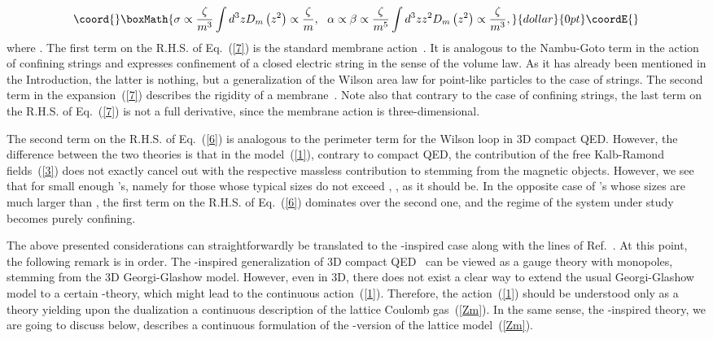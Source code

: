 \documentclass[a4paper,12pt]{article}
\begin{document}
$$\coord{}\boxMath{\sigma\propto\frac{\zeta}{m^3}\int d^3zD_m\left(z^2\right)\propto 
\frac{\zeta}{m},~~ 
\alpha\propto\beta\propto\frac{\zeta}{m^5}\int d^3zz^2D_m\left(z^2\right)\propto 
\frac{\zeta}{m^3},}{dollar}{0pt}\coordE{}$$
where \coordHE{}.
The first term on the R.H.S. of Eq.~(\ref{7}) is the standard membrane action~\cite{sma}.
It is analogous to the Nambu-Goto term in the action of confining strings 
and expresses confinement of a closed electric string in the 
sense of the volume law. As it has already been mentioned in the Introduction, 
the latter is nothing, but a generalization of the Wilson area law for point-like
particles to the case of strings. The second term in the expansion~(\ref{7}) 
describes the rigidity of a membrane~\cite{ridmem}. Note also that contrary to the case of confining strings,
the last term on the R.H.S. of Eq.~(\ref{7}) is not a full derivative, since the membrane action is 
three-dimensional.
 
The second term on the R.H.S. of Eq.~(\ref{6}) is analogous to the perimeter term for the Wilson loop
in 3D compact QED. However, the difference between the two theories is that in the model~(\ref{1}),
contrary to compact QED, the contribution of the free Kalb-Ramond fields~(\ref{3}) does not exactly cancel out  
with the respective massless contribution to \coordHE{} stemming from the magnetic objects.
However, we see that for small enough \myHighlight{$\Sigma$}\coordHE{}'s, namely for those whose typical sizes do not exceed \coordHE{}, 
\coordHE{}, as it should be. In the opposite case
of \myHighlight{$\Sigma$}\coordHE{}'s whose sizes are much larger than \coordHE{}, the first term on the R.H.S. of Eq.~(\ref{6}) 
dominates over the second one, and the regime of the system under study becomes purely confining.

The above presented considerations can straightforwardly be translated to the \coordHE{}-inspired case along with the 
lines of Ref.~\cite{su3}. At this point, the following remark is in order.
The \coordHE{}-inspired generalization of 3D compact QED~\cite{ws} can be viewed as 
a \coordHE{} gauge theory with monopoles, stemming from the 3D \coordHE{} Georgi-Glashow model.  However, 
even in 3D, there does not exist a clear way to extend the usual \coordHE{} Georgi-Glashow model
to a certain \coordHE{}-theory, which might lead to the continuous action~(\ref{1}). Therefore, the action~(\ref{1}) should be 
understood only as a theory yielding upon the dualization a continuous description of the lattice Coulomb gas~(\ref{Zm}). In the same sense, the 
\coordHE{}-inspired theory, we are going to discuss below, describes a continuous formulation of the \coordHE{}-version
of the lattice model~(\ref{Zm}). 
\end{document}
